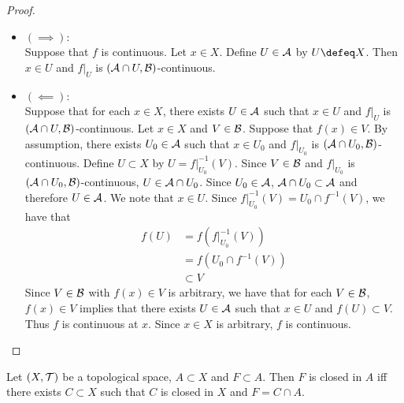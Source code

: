 \documentclass{book}
\begin{document}
\begin{proof}\
	\begin{itemize}
		\item $(\implies)$: \\
		Suppose that $f$ is continuous. Let $x \in X$. Define $U \in \mathcal{A}$ by $U \defeq X$. Then $x \in U$ and $f|_U$ is $(\mathcal{A} \cap U, \mathcal{B})$-continuous. 
		\item $(\impliedby)$: \\
		Suppose that for each $x \in X$, there exists $U \in \mathcal{A}$ such that $x \in U$ and $f|_U$ is $(\mathcal{A} \cap U, \mathcal{B})$-continuous. Let $x \in X$ and $V \in \mathcal{B}$. Suppose that $f(x) \in V$. By assumption, there exists $U_0 \in \mathcal{A}$ such that $x \in U_0$ and $f|_{U_0}$ is $(\mathcal{A} \cap U_0, \mathcal{B})$-continuous. Define $U \subset X$ by $U = f|_{U_0}^{-1}(V)$. Since $V \in \mathcal{B}$ and $f|_{U_0}$ is $(\mathcal{A} \cap U_0, \mathcal{B})$-continuous, $U \in \mathcal{A} \cap U_0$. Since $U_0 \in \mathcal{A}$, $\mathcal{A} \cap U_0 \subset \mathcal{A}$ and therefore $U \in \mathcal{A}$. We note that $x \in U$. Since $f|_{U_0}^{-1}(V) = U_0 \cap f^{-1}(V)$, we have that 
		\begin{align*}
			f(U)
			& = f(f|_{U_0}^{-1}(V)) \\
			& = f(U_0 \cap f^{-1}(V)) \\
			& \subset V
		\end{align*} 
		Since $V \in \mathcal{B}$ with $f(x) \in V$ is arbitrary, we have that for each $V \in \mathcal{B}$, $f(x) \in V$ implies that there exists $U \in \mathcal{A}$ such that $x \in U$ and $f(U) \subset V$. Thus $f$ is continuous at $x$. Since $x \in X$ is arbitrary, $f$ is continuous. 
	\end{itemize}
\end{proof}

\begin{ex} 
	Let $(X, \mathcal{T})$ be a topological space, $A \subset X$ and $F \subset A$. Then $F$ is closed in $A$ iff there exists $C \subset X$ such that $C$ is closed in $X$ and $F = C \cap A$. 
\end{ex}
\end{document}

